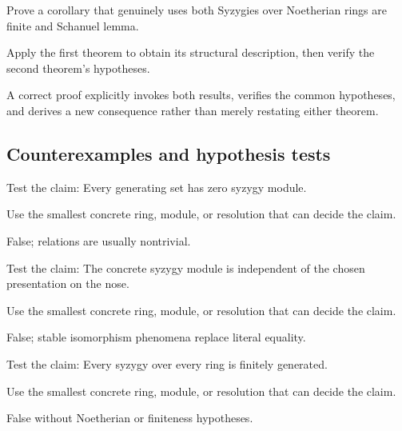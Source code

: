\begin{exercise}\label{exr:v24-expand-09}
Prove a corollary that genuinely uses both Syzygies over Noetherian rings are finite and Schanuel lemma.
\end{exercise}
\begin{hint}
Apply the first theorem to obtain its structural description, then verify the second theorem's hypotheses.
\end{hint}
\begin{solution}
A correct proof explicitly invokes both results, verifies the common hypotheses, and derives a new consequence rather than merely restating either theorem.
\end{solution}

\subsection*{Counterexamples and hypothesis tests}

\begin{exercise}[No relations]\label{exr:v24-expand-10}
Test the claim: Every generating set has zero syzygy module.
\end{exercise}
\begin{hint}
Use the smallest concrete ring, module, or resolution that can decide the claim.
\end{hint}
\begin{solution}
False; relations are usually nontrivial.
\end{solution}

\begin{exercise}\label{exr:v24-expand-11}
Test the claim: The concrete syzygy module is independent of the chosen presentation on the nose.
\end{exercise}
\begin{hint}
Use the smallest concrete ring, module, or resolution that can decide the claim.
\end{hint}
\begin{solution}
False; stable isomorphism phenomena replace literal equality.
\end{solution}

\begin{exercise}\label{exr:v24-expand-12}
Test the claim: Every syzygy over every ring is finitely generated.
\end{exercise}
\begin{hint}
Use the smallest concrete ring, module, or resolution that can decide the claim.
\end{hint}
\begin{solution}
False without Noetherian or finiteness hypotheses.
\end{solution}

